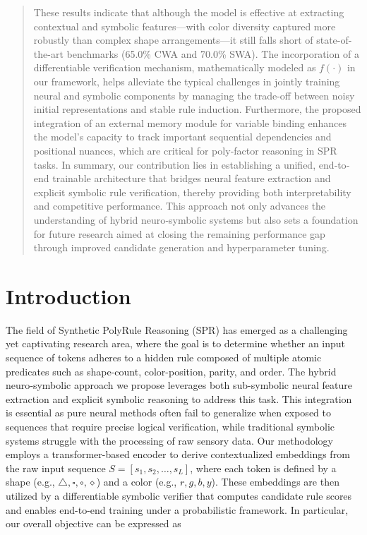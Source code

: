 \documentclass{article}
\begin{document}
\begin{abstract}
These results indicate that although the model is effective at extracting contextual and symbolic features—with color diversity captured more robustly than complex shape arrangements—it still falls short of state-of-the-art benchmarks (65.0\% CWA and 70.0\% SWA). The incorporation of a differentiable verification mechanism, mathematically modeled as \( f(\cdot) \) in our framework, helps alleviate the typical challenges in jointly training neural and symbolic components by managing the trade-off between noisy initial representations and stable rule induction. Furthermore, the proposed integration of an external memory module for variable binding enhances the model’s capacity to track important sequential dependencies and positional nuances, which are critical for poly‐factor reasoning in SPR tasks. In summary, our contribution lies in establishing a unified, end‐to‐end trainable architecture that bridges neural feature extraction and explicit symbolic rule verification, thereby providing both interpretability and competitive performance. This approach not only advances the understanding of hybrid neuro‐symbolic systems but also sets a foundation for future research aimed at closing the remaining performance gap through improved candidate generation and hyperparameter tuning.
\end{abstract}

\section{Introduction}
The field of Synthetic PolyRule Reasoning (SPR) has emerged as a challenging yet captivating research area, where the goal is to determine whether an input sequence of tokens adheres to a hidden rule composed of multiple atomic predicates such as shape-count, color-position, parity, and order. The hybrid neuro‐symbolic approach we propose leverages both sub-symbolic neural feature extraction and explicit symbolic reasoning to address this task. This integration is essential as pure neural methods often fail to generalize when exposed to sequences that require precise logical verification, while traditional symbolic systems struggle with the processing of raw sensory data. Our methodology employs a transformer-based encoder to derive contextualized embeddings from the raw input sequence \( S = [s_1, s_2, \ldots, s_L] \), where each token is defined by a shape (e.g., \(\triangle, \square, \circ, \diamond\)) and a color (e.g., \(r, g, b, y\)). These embeddings are then utilized by a differentiable symbolic verifier that computes candidate rule scores and enables end-to-end training under a probabilistic framework. In particular, our overall objective can be expressed as
\end{document}
